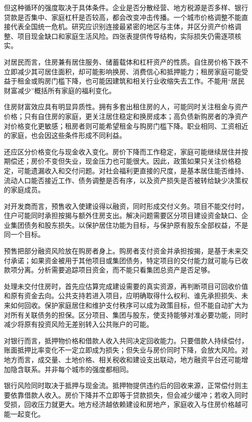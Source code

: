 \documentclass[UTF8,fontset=fandol,zihao=-4,oneside,openany]{ctexbook}
\begin{document}
但这种循环的强度取决于具体条件。企业是否分散经营、地方税源是否多样、银行贷款是否集中、家庭杠杆是否较高，都会改变冲击传播。一个城市价格调整不能直接代表全国统一危机。研究应识别连接最紧密的地区与主体，并区分资产价格调整、项目现金缺口和家庭生活风险。四张表提供传导结构，实际损失仍需逐项核实。

对居民而言，住房兼有居住服务、储蓄载体和杠杆资产的性质。自住房价格下跌不立即减少其可居住面积，却可能影响换房、消费信心和抵押能力；租房家庭可能受益于租金或购房门槛下降，也可能因建筑和相关行业收缩失去工作。不能用“居民财富减少”概括所有家庭的福利变化。

\label{arg:P123}
住房财富效应具有明显异质性。拥有多套出租住房的人，可能同时关注租金与资产价格；只有自住房的家庭，更关注居住稳定和换房成本；高负债新购房者的净资产对价格变化更敏感；租房者则可能希望租金与购房门槛下降。职业相同、工资相近的家庭，也会因这些条件形成不同利益。

还应区分价格变化与现金收入变化。房价下降而工作稳定，家庭可能继续居住并按期偿还；房价不变但失业，现金压力也可能很大。因此，政策如果只关注价格稳定，可能遗漏收入和交付问题。对社会福利更直接的尺度，是基本居住能否维持、流动人口能否接近工作、债务调整是否有序，以及资产损失是否被转给缺少决策权的家庭成员。

对开发商而言，预售收入使建设得以融资，同时形成交付义务。项目不能交付时，住户可能同时承担按揭与额外住房支出。解决问题需要区分项目建设资金缺口、企业集团债务和股东损失。以保护居住功能为目标，与保护原有股东全部权益，不是同一个目标。

\label{arg:P124}
预售把部分融资风险放在购房者身上。购房者支付资金并承担按揭，是基于未来交付承诺；如果资金被用于其他项目或集团债务，特定项目的交付能力就可能与已收款项分离。分析需要追踪项目资金，而不能只看集团总资产是否足够。

处理未交付住房时，首先应估算完成建设需要的真实资源，再判断项目可回收价值和原有资金去向。公共支持若进入项目，应明确取得什么权利、谁先承担损失、未来如何回收。保护家庭居住和维护支付秩序可以成为政策目标，但不能自动扩大为对所有关联债务的担保。区分项目、集团与股东，使支持能够对准必要功能，同时减少将原有投资风险无差别转入公共账户的可能。

对银行而言，抵押物价格和借款人收入共同决定回收能力。只要借款人持续偿付，账面抵押比率变化不一定立即成为损失；但失业与房价同时下降，会放大风险。对地方而言，成交量、土地价格、相关税收和建设支出联动，地方融资平台还可能增加隐含联系。并非每个城市的强度都相同。

\label{arg:P125}
银行风险同时取决于抵押与现金流。抵押物提供违约后的回收来源，正常偿付则主要依靠借款人收入。房价下降并不立即等于贷款损失，但会减少缓冲；若收入同时受损，回收压力就更大。地方经济越依赖建设和房地产，家庭收入与住房价格越可能一起变化。
\end{document}
